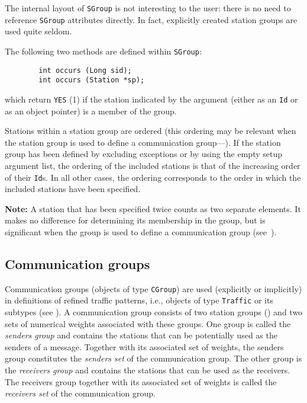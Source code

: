 The internal layout of {\tt SGroup} is not interesting to the user: there
is no need to reference {\tt SGroup} attributes directly.
In fact, explicitly created station groups are used quite seldom.

The following two methods are defined within {\tt SGroup}:
\begin{verbatim}
        int occurs (Long sid);
        int occurs (Station *sp);
\end{verbatim}
which return {\tt YES} (1) if the station indicated by the argument (either
as an {\tt Id} or as an object pointer) is a member of the group.

Stations within a station group are ordered (this ordering may be relevant when
the station group is used to define a communication group---).
If the station group has been defined by excluding exceptions or by using
the empty setup argument list, the ordering
of the included stations is that of the increasing order of their
{\tt Id}s.
In all other cases, the ordering corresponds to the order in which the
included stations have been specified.

\medskip

\noindent
{\bf Note:} A station that has been specified
twice counts as two separate elements.
It makes no difference for determining its membership in the
group, but is significant when the group is used to define a
communication group (see~).

\subsection{Communication groups}
\label{rm_cl_cg}

Communication groups (objects of type {\tt CGroup})
are used (explicitly or implicitly)
in definitions of refined traffic patterns, i.e.,
objects of type {\tt Traffic} or its subtypes (see ).
A communication group consists of two station groups ()
and two sets of numerical weights associated with these groups.
One group is called the {\em senders group\/} and contains the stations that
can be potentially used as the senders of a message.
Together with its associated set of weights, the senders group constitutes
the {\em senders set\/} of the communication group.
The other group is the {\em receivers group\/} and contains the stations that
can be used as the receivers.
The receivers group together with its associated set of weights is called
the {\em receivers set\/} of the communication group.

